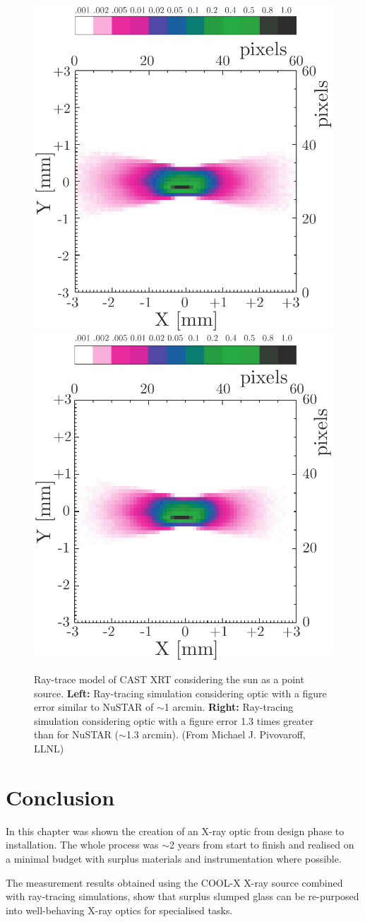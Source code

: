 \begin{figure}[htbp]
  \centering
    \includegraphics[width=0.47\linewidth]{figures/cast/sunspot13.pdf}
    \includegraphics[width=0.47\linewidth]{figures/cast/sunspot10.pdf}
  \caption{\footnotesize Ray-trace model of CAST XRT considering the sun as a point source.  \textbf{Left:} Ray-tracing simulation considering optic with a figure error similar to NuSTAR of $\sim$1 arcmin.  \textbf{Right:} Ray-tracing simulation considering optic with a figure error 1.3 times greater than for NuSTAR ($\sim$1.3 arcmin). (From Michael J. Pivovaroff, LLNL) }
  \label{fig:raytracing2}
\end{figure}

\section{Conclusion}
In this chapter was shown the creation of an X-ray optic from design phase to installation. The whole process was $\sim$2 years from start to finish and realised on a minimal budget with surplus materials and instrumentation where possible.

The measurement results obtained using the COOL-X X-ray source combined with ray-tracing simulations, show that surplus slumped glass can be re-purposed into well-behaving X-ray optics for specialised tasks.


